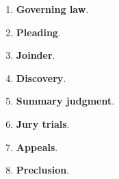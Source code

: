 \begin{enumerate}
\begin{enumerate}
\begin{enumerate}
\begin{enumerate}
                (scope), 1391 (venue generally), 1404 (transfer), 1406 
                (dealing with improper venue). 
                \item Waivable.
                \item Transfer is available between districts.
            \end{enumerate}
            \item \textbf{\emph{Forum non conveniens}}.
            \begin{enumerate}
                \item Is there a more convenient forum where the case should 
                be adjudicated?
                \item Differences in substantive law are insufficient for FNC 
                unless the law in the target forum is egregiously bad.
                \item Successful FNC motions result in dismissal. \emph{Piper} 
                (plane crash in Scotland).
            \end{enumerate}
        \end{enumerate}
    \end{enumerate}
    \item \textbf{Governing law}.
    \item \textbf{Pleading}.
    \item \textbf{Joinder}.
    \item \textbf{Discovery}.
    \item \textbf{Summary judgment}.
    \item \textbf{Jury trials}.
    \item \textbf{Appeals}.
    \item \textbf{Preclusion}.
\end{enumerate}




